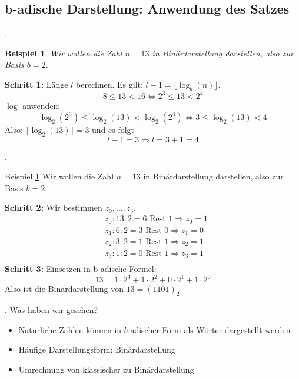 \documentclass{beamer}
\newtheorem{beispiel}[satz]{Beispiel}
\newcommand{\secframe}{\begin{frame}{\insertsectionnumber. \insertsection}}
\newcommand{\subsecframe}{\begin{frame}{\insertsectionnumber.\insertsubsectionnumber \ \insertsubsection}}
\begin{document}
    \subsection{b-adische Darstellung: Anwendung des Satzes}        

        \subsecframe
            \begin{beispiel}\label{bsp:b-adisch}
                Wir wollen die Zahl $n=13$ in Binärdarstellung darstellen, also zur Basis $b=2$.
            \end{beispiel}
            \vspace{\baselineskip}
            \textbf{Schritt 1:} Länge $l$ berechnen. 
            Es gilt: $l-1 = \lfloor \log_b(n) \rfloor$. \\
                \[8 \leq 13 < 16 \Leftrightarrow 2^3 \leq 13 < 2^4\]
            $\log$ anwenden:
                \[\log_2(2^3) \leq \log_2(13) < \log_2(2^4) \Leftrightarrow 3 \leq \log_2(13) < 4\]
            Also: $\lfloor \log_2(13) \rfloor = 3$ und es folgt
            \[l-1 = 3 \Leftrightarrow l = 3+1=4\]
        \end{frame}        

        \subsecframe
            \begin{block}{Beispiel \ref{bsp:b-adisch}}
                Wir wollen die Zahl $n=13$ in Binärdarstellung darstellen, also zur Basis $b=2$.
            \end{block}        
            \vspace{\baselineskip}
            \textbf{Schritt 2:} Wir bestimmen $z_0, \dots, z_3$.
            \begin{align*}
                &z_0\colon 13 : 2 = 6  \text{ Rest }1 \Rightarrow z_0 = 1 \\
                &z_1\colon 6 : 2 = 3  \text{ Rest }0 \Rightarrow z_1 = 0 \\
                &z_2\colon 3 : 2 = 1  \text{ Rest }1 \Rightarrow z_2 = 1 \\
                &z_3\colon 1 : 2 = 0  \text{ Rest }1 \Rightarrow z_3 = 1 \\
            \end{align*}
            \vspace{\baselineskip}
            \textbf{Schritt 3:} Einsetzen in b-adische Formel:
            \[13 = 1 \cdot 2^3 + 1\cdot 2^2 + 0 \cdot 2^1 + 1 \cdot 2^0\]
            Also ist die Binärdarstellung von $13 = (1101)_2$
        \end{frame}        

    \secframe
        Was haben wir gesehen?
        \begin{itemize}
            \item Natürliche Zahlen können in $b$-adischer Form als Wörter dargestellt werden
            \item Häufige Darstellungsform: Binärdarstellung
            \item Umrechnung von klassischer zu Binärdarstellung
        \end{itemize}
    \end{frame}
\end{document}
